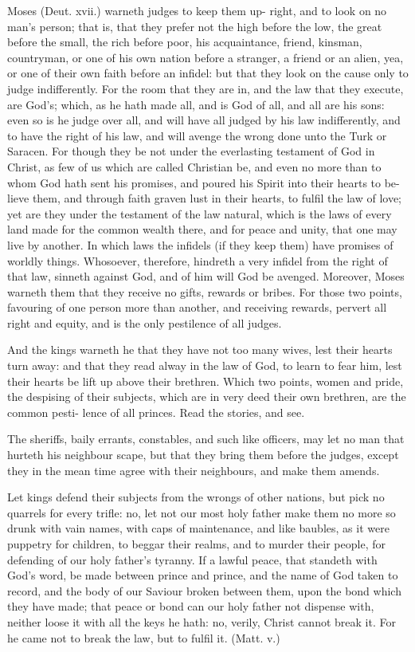\documentclass{custom}
\begin{document}
Moses (Deut. xvii.) warneth judges to keep them up- 
right, and to look on no man's person; that is, that they 
prefer not the high before the low, the great before the 
small, the rich before poor, his acquaintance, friend, 
kinsman, countryman, or one of his own nation before 
a stranger, a friend or an alien, yea, or one of their own 
faith before an infidel: but that they look on the cause 
only to judge indifferently. For the room that they are 
in, and the law that they execute, are God's; which, as 
he hath made all, and is God of all, and all are his sons: 
even so is he judge over all, and will have all judged by 
his law indifferently, and to have the right of his law, and 
will avenge the wrong done unto the Turk or Saracen. 
For though they be not under the everlasting testament of 
God in Christ, as few of us which are called Christian 
be, and even no more than to whom God hath sent his 
promises, and poured his Spirit into their hearts to be- 
lieve them, and through faith graven lust in their hearts, 
to fulfil the law of love; yet are they under the testament 
of the law natural, which is the laws of every land made 
for the common wealth there, and for peace and unity, 
that one may live by another. In which laws the infidels 
(if they keep them) have promises of worldly things. 
Whosoever, therefore, hindreth a very infidel from the 
right of that law, sinneth against God, and of him will 
God be avenged. Moreover, Moses warneth them that 
they receive no gifts, rewards or bribes. For those two 
points, favouring of one person more than another, and 
receiving rewards, pervert all right and equity, and is the 
only pestilence of all judges. 

And the kings warneth he that they have not too many 
wives, lest their hearts turn away: and that they read 
alway in the law of God, to learn to fear him, lest their 
hearts be lift up above their brethren. Which two points, 
women and pride, the despising of their subjects, which 
are in very deed their own brethren, are the common pesti- 
lence of all princes. Read the stories, and see. 

The sheriffs, baily errants, constables, and such like officers, 
may let no man that hurteth his neighbour scape, but that 
they bring them before the judges, except they in the mean 
time agree with their neighbours, and make them amends. 

Let kings defend their subjects from the wrongs of other 
nations, but pick no quarrels for every trifle: no, let not 
our most holy father make them no more so drunk with 
vain names, with caps of maintenance, and like baubles, 
as it were puppetry for children, to beggar their realms, 
and to murder their people, for defending of our holy 
father's tyranny. If a lawful peace, that standeth with 
God's word, be made between prince and prince, and 
the name of God taken to record, and the body of our 
Saviour broken between them, upon the bond which they 
have made; that peace or bond can our holy father not 
dispense with, neither loose it with all the keys he hath:
no, verily, Christ cannot break it. For he came not to 
break the law, but to fulfil it. (Matt. v.) 
\end{document}
